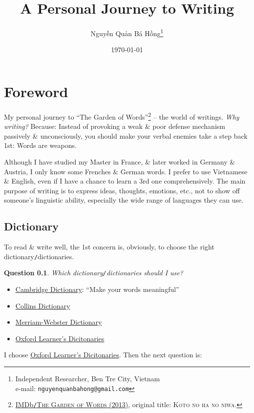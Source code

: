 \documentclass[oneside]{book}
\title{A Personal Journey to Writing}
\author{\selectlanguage{vietnamese} Nguyễn Quản Bá Hồng\footnote{Independent Researcher, Ben Tre City, Vietnam\\e-mail: \texttt{nguyenquanbahong@gmail.com}}}
\date{\today}
\numberwithin{equation}{section}
\newtheorem{question}{Question}[chapter]
\begin{document}
\maketitle
\setcounter{tocdepth}{3}
\setcounter{secnumdepth}{3}
\tableofcontents


\chapter*{Foreword}
My personal journey to ``The Garden of Words''\footnote{\href{https://www.imdb.com/title/tt2591814/}{IMDb\texttt{/}\textsc{The Garden of Words} (2013)}, original title: \textsc{Koto no ha no niwa}.} -- the world of writings. \textit{Why writing?} Because: Instead of provoking a weak \& poor defense mechanism passively \& unconsciously, you should make your verbal enemies take a step back 1st: Words are weapons.

Although I have studied my Master in France, \& later worked in Germany \& Austria, I only know some Frenches \& German words. I prefer to use Vietnamese \& English, even if I have a chance to learn a 3rd one comprehensively. The main purpose of writing is to express ideas, thoughts, emotions, etc., not to show off someone's linguistic ability, especially the wide range of languages they can use.

\section{Dictionary}
To read \& write well, the 1st concern is, obviously, to choose the right dictionary\texttt{/}dictionaries.

\begin{question}
	Which dictionary\emph{\texttt{/}}dictionaries should I use?
\end{question}

\begin{itemize}
	\item \href{https://dictionary.cambridge.org/}{Cambridge Dictionary}: ``Make your words meaningful''
	\item \href{https://www.collinsdictionary.com/us/}{Collins Dictionary}
	\item \href{https://www.merriam-webster.com/}{Merriam-Webster Dictionary}
	\item \href{https://www.oxfordlearnersdictionaries.com/}{Oxford Learner's Dicitonaries}
\end{itemize}
I choose \href{https://www.oxfordlearnersdictionaries.com/}{Oxford Learner's Dicitonaries}. Then the next question is:
\end{document}
